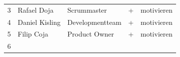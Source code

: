 \begin{longtable}[]{@{}lllll@{}}
\begin{minipage}[t]{0.02\columnwidth}
3\strut
\end{minipage} & \begin{minipage}[t]{0.19\columnwidth}\raggedright
Rafael Doja\strut
\end{minipage} & \begin{minipage}[t]{0.20\columnwidth}\raggedright
Scrummaster\strut
\end{minipage} & \begin{minipage}[t]{0.15\columnwidth}\raggedright
+\strut
\end{minipage} & \begin{minipage}[t]{0.30\columnwidth}\raggedright
motivieren\strut
\end{minipage}\tabularnewline
\begin{minipage}[t]{0.02\columnwidth}\raggedright
4\strut
\end{minipage} & \begin{minipage}[t]{0.19\columnwidth}\raggedright
Daniel Kisling\strut
\end{minipage} & \begin{minipage}[t]{0.20\columnwidth}\raggedright
Developmentteam\strut
\end{minipage} & \begin{minipage}[t]{0.15\columnwidth}\raggedright
+\strut
\end{minipage} & \begin{minipage}[t]{0.30\columnwidth}\raggedright
motivieren\strut
\end{minipage}\tabularnewline
\begin{minipage}[t]{0.02\columnwidth}\raggedright
5\strut
\end{minipage} & \begin{minipage}[t]{0.19\columnwidth}\raggedright
Filip Coja\strut
\end{minipage} & \begin{minipage}[t]{0.20\columnwidth}\raggedright
Product Owner\strut
\end{minipage} & \begin{minipage}[t]{0.15\columnwidth}\raggedright
+\strut
\end{minipage} & \begin{minipage}[t]{0.30\columnwidth}\raggedright
motivieren\strut
\end{minipage}\tabularnewline
\begin{minipage}[t]{0.02\columnwidth}\raggedright
6\strut
\end{minipage} & \begin{minipage}[t]{0.19\columnwidth}\raggedright

\end{minipage}
\end{longtable}
